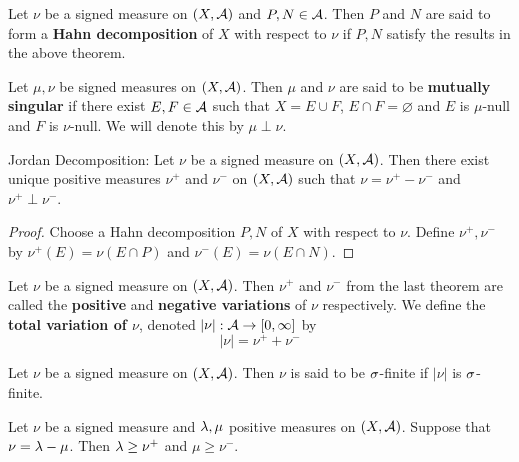 \documentclass{book}
\begin{document}
	\begin{defn}  
		Let $\nu$ be a signed measure on $(X, \mathcal{A})$ and $P,N \in \mathcal{A}$. Then $P$ and $N$ are said to form a \textbf{Hahn decomposition} of $X$ with respect to $\nu$ if $P,N$ satisfy the results in the above theorem.
	\end{defn}
	
	\begin{defn}  
		Let $\mu, \nu$ be signed measures on $(X, \mathcal{A})$. Then $\mu$ and $\nu$ are said to be \textbf{mutually singular} if there exist $E, F \in \mathcal{A}$ such that $X = E \cup F$, $E \cap F = \varnothing$ and $E$ is $\mu$-null and $F$ is $\nu$-null. We will denote this by $\mu \perp \nu$.
	\end{defn}
	
	\begin{thm}{Jordan Decomposition:}
		Let $\nu$ be a signed measure on $(X, \mathcal{A})$. Then there exist unique positive measures $\nu^+$ and $\nu^-$ on $(X, \mathcal{A})$ such that $\nu = \nu^+ - \nu^-$ and $\nu^+ \perp \nu^-$. 
	\end{thm}
	
	\begin{proof}
		Choose a Hahn decomposition $P,N$ of $X$ with respect to $\nu$. Define $\nu^+, \nu^-$ by $\nu^+(E)= \nu(E \cap P)$ and $\nu^-(E) = \nu(E \cap N)$.
	\end{proof}
	
	\begin{defn}  
		Let $\nu$ be a signed measure on $(X, \mathcal{A})$. Then $\nu^+$ and $\nu^-$ from the last theorem are called the \textbf{positive} and \textbf{negative variations} of $\nu$ respectively. We define the \textbf{total variation of $\nu$}, denoted $|\nu|:\mathcal{A} \rightarrow [0, \infty]$ by $$|\nu| = \nu^+ + \nu^-$$ 
	\end{defn}
	
	\begin{defn}  
		Let $\nu$ be a signed measure on $(X,\mathcal{A})$. Then $\nu$ is said to be $\sigma$-finite if $|\nu|$ is $\sigma$-finite.
	\end{defn}
	
	\begin{ex}  
		Let $\nu$ be a signed measure and $\lambda, \mu$ positive measures on $(X,\mathcal{A})$. Suppose that $\nu = \lambda - \mu$. Then $\lambda \geq \nu^+$ and $\mu \geq \nu^-$.
	\end{ex}
	
\end{document}
